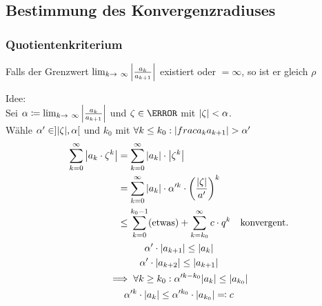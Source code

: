 \subsection{Bestimmung des Konvergenzradiuses}
\subsubsection{Quotientenkriterium}
Falls der Grenzwert $\lim_{k \rightarrow \infty} \abs{\frac{a_k}{a_{k+1}}}$ existiert oder $= \infty$, so ist er gleich $\rho$

Idee:\\
Sei $\alpha \coloneqq \lim_{k \rightarrow \infty} \abs{\frac{a_k}{a_{k+1}}}$ und $\zeta \in \C$ mit $\abs{\zeta} < \alpha$.\\
Wähle $\alpha' \in ] \abs{\zeta} , \alpha [$ und $k_0$ mit $\forall k \leq k_0 : \abs{frac{a_k}{a_{k+1}}} > \alpha'$
\begin{gather*}
	\begin{split}
		\sum_{k=0}^\infty \abs{a_k \cdot \zeta^k}	&= \sum_{k=0}^\infty \abs{a_k} \cdot \abs{\zeta^k} \\
										&= \sum_{k=0}^\infty \abs{a_k} \cdot \alpha'^k \cdot \left( \frac{\abs{\zeta}}{a'} \right)^k \\
										&\leq \sum_{k=0}^{k_0 - 1} (\text{etwas}) + \sum_{k=k_0}^\infty c \cdot q^k \quad \text{konvergent.} 
	\end{split}\\
	\alpha' \cdot \abs{a_{k+1}} \leq \abs{a_k} \\
	\alpha' \cdot \abs{a_{k+2}} \leq \abs{a_{k+1}} \\
	\implies \forall k \geq k_0 : \alpha'^{k-k_0} \abs{a_k} \leq \abs{a_{k_0}} \\
	\alpha'^k \cdot \abs{a_k} \leq  \alpha'^{k_0} \cdot \abs{a_{k_0}} \eqqcolon c
\end{gather*}

